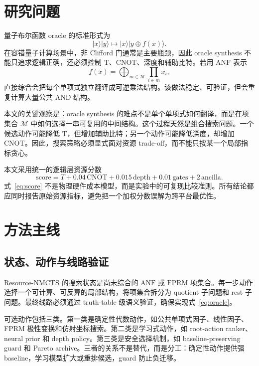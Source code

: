 \documentclass[UTF8,fontset=macnew,11pt]{ctexart}
\newcommand{\method}{Resource-NMCTS}
\newcommand{\anf}{\ensuremath{\mathrm{ANF}}}
\newcommand{\fprm}{\ensuremath{\mathrm{FPRM}}}
\newcommand{\score}{\ensuremath{\mathrm{score}}}
\newcommand{\cnot}{\ensuremath{\mathrm{CNOT}}}
\newcommand{\tcount}{\ensuremath{\mathrm{T}}}
\begin{document}
\section{研究问题}

量子布尔函数 oracle 的标准形式为
\begin{equation}
  |x\rangle |y\rangle \mapsto |x\rangle |y\oplus f(x)\rangle .
  \label{eq:oracle}
\end{equation}
在容错量子计算场景中，非 Clifford 门通常是主要瓶颈，因此 oracle synthesis 不能只追求逻辑正确，还必须控制 \tcount{}、\cnot{}、深度和辅助比特。若用 \anf{} 表示
\begin{equation}
  f(x)=\bigoplus_{m\in\mathcal{M}}\prod_{i\in m}x_i ,
  \label{eq:anf}
\end{equation}
直接综合会把每个单项式独立翻译成可逆乘法结构。该做法稳定、可验证，但会重复计算大量公共 AND 结构。

本文的关键观察是：oracle synthesis 的难点不是单个单项式如何翻译，而是在项集合 $\mathcal{M}$ 中如何选择一串可复用的中间结构。这个过程天然是组合搜索问题。一个候选动作可能降低 \tcount{}，但增加辅助比特；另一个动作可能降低深度，却增加 \cnot{}。因此，搜索策略必须显式面对资源 trade-off，而不能只按某一个局部指标贪心。

本文采用统一的逻辑层资源分数
\begin{equation}
  \score = T + 0.04\,\mathrm{CNOT} + 0.015\,\mathrm{depth}
         + 0.01\,\mathrm{gates} + 2\,\mathrm{ancilla}.
  \label{eq:score}
\end{equation}
式~\eqref{eq:score} 不是物理硬件成本模型，而是实验中的可复现比较准则。所有结论都应同时报告原始资源指标，避免把一个加权分数误解为跨平台最优性。

\section{方法主线}

\subsection{状态、动作与线路验证}

\method{} 的搜索状态是尚未综合的 \anf{} 或 \fprm{} 项集合。每一步动作选择一个可计算、可反算的局部结构，将项集合拆分为 quotient 子问题和 rest 子问题。最终线路必须通过 truth-table 级语义验证，确保实现式~\eqref{eq:oracle}。

可选动作包括三类。第一类是确定性代数动作，如公共单项式因子、线性因子、FPRM 极性变换和仿射坐标搜索。第二类是学习式动作，如 root-action ranker、neural prior 和 depth policy。第三类是安全选择机制，如 baseline-preserving guard 和 Pareto archive。三者的关系不是替代，而是分工：确定性动作提供强 baseline，学习模型扩大或重排候选，guard 防止负迁移。
\end{document}
